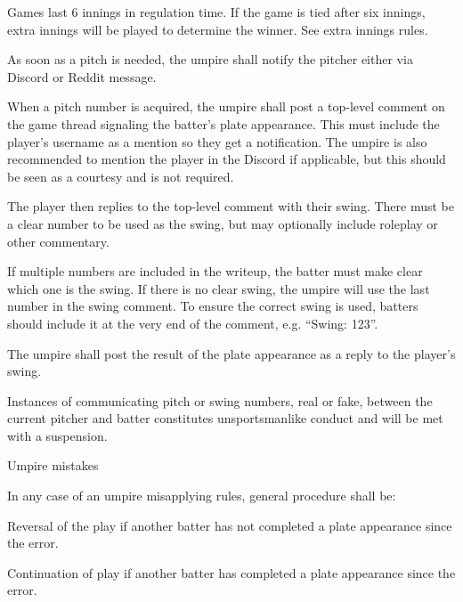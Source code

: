 \begin{deepEnumerate}
\begin{deepEnumerate}
\begin{deepEnumerate}
\begin{deepEnumerate}
\begin{deepEnumerate}
\begin{deepEnumerate}
					\end{deepEnumerate}
				\end{deepEnumerate}
			\end{deepEnumerate}
		\end{deepEnumerate}
		\item Games last 6 innings in regulation time. 
		If the game is tied after six innings, extra innings will be played to determine the winner. 
		See extra innings rules. %
		\item As soon as a pitch is needed, the umpire shall notify the pitcher either via Discord or Reddit message.
		\item When a pitch number is acquired, 
		the umpire shall post a top-level comment on the game thread signaling the batter’s plate appearance. 
		This must include the player’s username as a mention so they get a notification. 
		The umpire is also recommended to mention the player in the Discord if applicable, 
		but this should be seen as a courtesy and is not required.
		\item The player then replies to the top-level comment with their swing. 
		There must be a clear number to be used as the swing, but may optionally include roleplay or other commentary.
		\begin{deepEnumerate}
			\item If multiple numbers are included in the writeup, the batter must make clear which one is the swing. 
			If there is no clear swing, the umpire will use the last number in the swing comment. 
			To ensure the correct swing is used, batters should include it at the very end of the comment, 
			e.g. “Swing: 123”.
		\end{deepEnumerate}
		\item The umpire shall post the result of the plate appearance as a reply to the player’s swing.
		\item Instances of communicating pitch or swing numbers, real or fake, 
		between the current pitcher and batter constitutes unsportsmanlike conduct and will be met with a suspension.
		\item Umpire mistakes
		\begin{deepEnumerate}
			\item In any case of an umpire misapplying rules, general procedure shall be:
			\begin{deepEnumerate}
				\item Reversal of the play if another batter has not completed a plate appearance since the error.
				\item Continuation of play if another batter has completed a plate appearance since the error.

\end{deepEnumerate}
\end{deepEnumerate}
\end{deepEnumerate}
\end{deepEnumerate}

